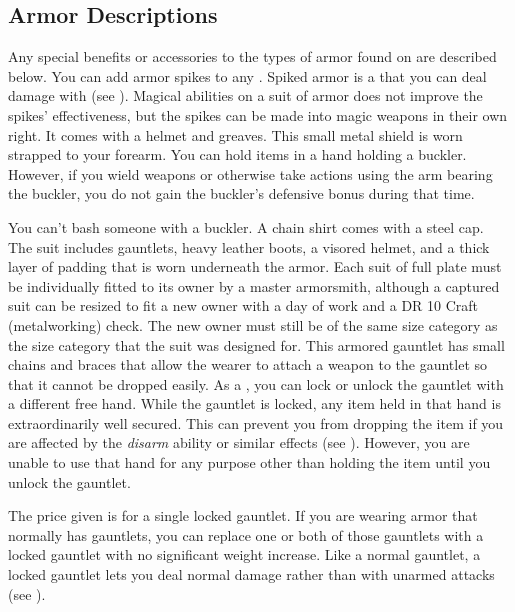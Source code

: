     \subsection{Armor Descriptions}
        Any special benefits or accessories to the types of armor found on  are described below.
         You can add armor spikes to any .
        Spiked armor is a  that you can deal damage with (see ).
        Magical abilities on a suit of armor does not improve the spikes' effectiveness, but the spikes can be made into magic weapons in their own right.
         It comes with a helmet and greaves.
         This small metal shield is worn strapped to your forearm.
        You can hold items in a hand holding a buckler.
        However, if you wield weapons or otherwise take actions using the arm bearing the buckler, you do not gain the buckler's defensive bonus during that time.
        \par You can't bash someone with a buckler.
         A chain shirt comes with a steel cap.
         The suit includes gauntlets, heavy leather boots, a visored helmet, and a thick layer of padding that is worn underneath the armor. Each suit of full plate must be individually fitted to its owner by a master armorsmith, although a captured suit can be resized to fit a new owner with a day of work and a DR 10 Craft (metalworking) check. The new owner must still be of the same size category as the size category that the suit was designed for.
         This armored gauntlet has small chains and braces that allow the wearer to attach a weapon to the gauntlet so that it cannot be dropped easily.
        As a , you can lock or unlock the gauntlet with a different free hand.
        While the gauntlet is locked, any item held in that hand is extraordinarily well secured.
        This can prevent you from dropping the item if you are affected by the \textit{disarm} ability or similar effects (see ).
        However, you are unable to use that hand for any purpose other than holding the item until you unlock the gauntlet.
        \par The price given is for a single locked gauntlet.
        If you are wearing armor that normally has gauntlets, you can replace one or both of those gauntlets with a locked gauntlet with no significant weight increase.
        Like a normal gauntlet, a locked gauntlet lets you deal normal damage rather than  with unarmed attacks (see ).
